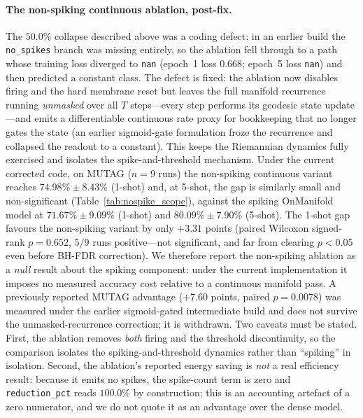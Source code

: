 \documentclass[a4paper,fleqn]{cas-dc}
\begin{document}
\paragraph{The non-spiking continuous ablation, post-fix.} The $50.0\%$ collapse described above was a coding defect: in an earlier build the \texttt{no\_spikes} branch was missing entirely, so the ablation fell through to a path whose training loss diverged to \texttt{nan} (epoch~1 loss $0.668$; epoch~5 loss \texttt{nan}) and then predicted a constant class. The defect is fixed: the ablation now disables firing and the hard membrane reset but leaves the full manifold recurrence running \emph{unmasked} over all $T$ steps---every step performs its geodesic state update---and emits a differentiable continuous rate proxy for bookkeeping that no longer gates the state (an earlier sigmoid-gate formulation froze the recurrence and collapsed the readout to a constant). This keeps the Riemannian dynamics fully exercised and isolates the spike-and-threshold mechanism. Under the current corrected code, on MUTAG ($n{=}9$ runs) the non-spiking continuous variant reaches $74.98\%\pm8.43\%$ (1-shot) and, at 5-shot, the gap is similarly small and non-significant (Table~\ref{tab:nospike_scope}), against the spiking OnManifold model at $71.67\%\pm9.09\%$ (1-shot) and $80.09\%\pm7.90\%$ (5-shot). The 1-shot gap favours the non-spiking variant by only $+3.31$ points (paired Wilcoxon signed-rank $p{=}0.652$, $5/9$ runs positive---not significant, and far from clearing $p{<}0.05$ even before BH-FDR correction). We therefore report the non-spiking ablation as a \emph{null} result about the spiking component: under the current implementation it imposes no measured accuracy cost relative to a continuous manifold pass. A previously reported MUTAG advantage ($+7.60$ points, paired $p{=}0.0078$) was measured under the earlier sigmoid-gated intermediate build and does not survive the unmasked-recurrence correction; it is withdrawn. Two caveats must be stated. First, the ablation removes \emph{both} firing and the threshold discontinuity, so the comparison isolates the spiking-and-threshold dynamics rather than ``spiking'' in isolation. Second, the ablation's reported energy saving is \emph{not} a real efficiency result: because it emits no spikes, the spike-count term is zero and \texttt{reduction\_pct} reads $100.0\%$ by construction; this is an accounting artefact of a zero numerator, and we do not quote it as an advantage over the dense model.
\end{document}

